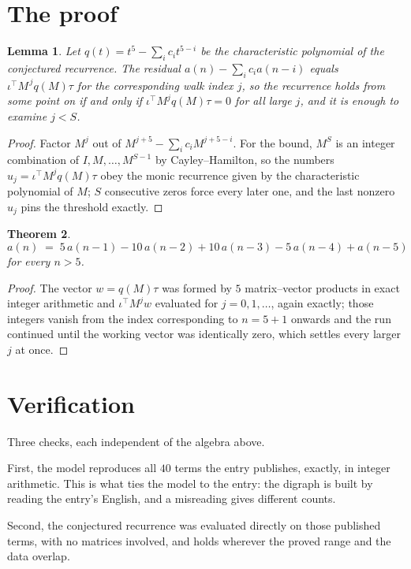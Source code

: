 \documentclass[11pt,a4paper]{article}
\theoremstyle{plain}
\newtheorem{theorem}{Theorem}
\newtheorem{lemma}[theorem]{Lemma}
\theoremstyle{definition}
\begin{document}
\section{The proof}

\begin{lemma}\label{lem:crit}
Let $q(t)=t^{5}-\sum_i c_it^{5-i}$ be the characteristic polynomial of the
conjectured recurrence. The residual $a(n)-\sum_ic_ia(n-i)$ equals
$\iota^{\!\top}M^{\,j}q(M)\tau$ for the corresponding walk index $j$, so the recurrence
holds from some point on if and only if $\iota^{\!\top}M^{j}q(M)\tau=0$ for all large $j$,
and it is enough to examine $j<S$.
\end{lemma}

\begin{proof}
Factor $M^{j}$ out of $M^{j+5}-\sum_ic_iM^{j+5-i}$. For the bound, $M^{S}$
is an integer combination of $I,M,\dots,M^{S-1}$ by Cayley--Hamilton, so the numbers
$u_j=\iota^{\!\top}M^{j}q(M)\tau$ obey the monic recurrence given by the characteristic
polynomial of $M$; $S$ consecutive zeros force every later one, and the last nonzero $u_j$
pins the threshold exactly.
\end{proof}

\begin{theorem}
\[
a(n)\;=\;5\,a(n-1) - 10\,a(n-2) + 10\,a(n-3) - 5\,a(n-4) + a(n-5)
\]
for every $n>5$.
\end{theorem}

\begin{proof}
The vector $w=q(M)\tau$ was formed by $5$ matrix--vector products in exact integer
arithmetic and $\iota^{\!\top}M^{j}w$ evaluated for $j=0,1,\dots$, again exactly; those
integers vanish from the index corresponding to $n=5+1$ onwards and the run continued
until the working vector was identically zero, which settles every larger $j$ at once.
\end{proof}

\section{Verification}

Three checks, each independent of the algebra above.

First, the model reproduces all $40$ terms the entry publishes, exactly, in integer
arithmetic. This is what ties the model to the entry: the digraph is built by reading the
entry's English, and a misreading gives different counts.

Second, the conjectured recurrence was evaluated directly on those published terms, with no
matrices involved, and holds wherever the proved range and the data overlap.
\end{document}
